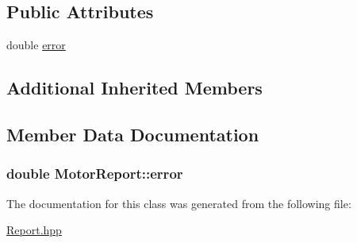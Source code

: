 \subsection*{Public Attributes}
\begin{DoxyCompactItemize}
\item 
double \hyperlink{classMotorReport_a119de9f4a4daca009a6933f4702f46ac}{error}
\end{DoxyCompactItemize}
\subsection*{Additional Inherited Members}


\subsection{Member Data Documentation}
\subsubsection[{\texorpdfstring{error}{error}}]{\setlength{\rightskip}{0pt plus 5cm}double Motor\+Report\+::error}\hypertarget{classMotorReport_a119de9f4a4daca009a6933f4702f46ac}{}\label{classMotorReport_a119de9f4a4daca009a6933f4702f46ac}


The documentation for this class was generated from the following file\+:\begin{DoxyCompactItemize}
\item 
\hyperlink{Report_8hpp}{Report.\+hpp}\end{DoxyCompactItemize}
